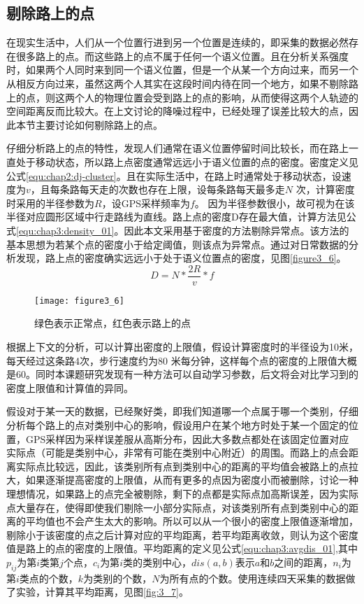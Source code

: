 \subsection{剔除路上的点}
在现实生活中，人们从一个位置行进到另一个位置是连续的，即采集的数据必然存在很多路上的点。而这些路上的点不属于任何一个语义位置。且在分析关系强度时，如果两个人同时来到同一个语义位置，但是一个从某一个方向过来，而另一个从相反方向过来，虽然这两个人其实在这段时间内待在同一个地方，如果不剔除路上的点，则这两个人的物理位置会受到路上的点的影响，从而使得这两个人轨迹的空间距离反而比较大。在上文讨论的降噪过程中，已经处理了误差比较大的点，因此本节主要讨论如何剔除路上的点。
\par 仔细分析路上的点的特性，发现人们通常在语义位置停留时间比较长，而在路上一直处于移动状态，所以路上点密度通常远远小于语义位置的点的密度。密度定义见公式\ref{equ:chap2:dj-cluster}。且在实际生活中，在路上时通常处于移动状态，设速度为$v$，且每条路每天走的次数也存在上限，设每条路每天最多走$N$ 次，计算密度时采用的半径参数为$R$，设GPS采样频率为$f$。 因为半径参数很小，故可视为在该半径对应圆形区域中行走路线为直线。路上点的密度D存在最大值，计算方法见公式\ref{equ:chap3:density_01}。因此本文采用基于密度的方法剔除异常点。该方法的基本思想为若某个点的密度小于给定阈值，则该点为异常点。通过对日常数据的分析发现，路上点的密度确实远远小于处于语义位置点的密度，见图\ref{figure3_6}。
\begin{equation}
\label{equ:chap3:density_01}
D=N \ast \frac{2R}{v} \ast f
\end{equation}
\begin{figure}[htp]
\centering
\texttt{[image: figure3\_6]}
\caption{绿色表示正常点，红色表示路上的点}
\label{fig:3_6}
\end{figure}
\par 根据上下文的分析，可以计算出密度的上限值，假设计算密度时的半径设为10米，每天经过这条路4次，步行速度约为80 米每分钟，这样每个点的密度的上限值大概是60。同时本课题研究发现有一种方法可以自动学习参数，后文将会对比学习到的密度上限值和计算值的异同。
\par 假设对于某一天的数据，已经聚好类，即我们知道哪一个点属于哪一个类别，仔细分析每个路上的点对类别中心的影响，假设用户在某个地方时处于某一个固定的位置，GPS采样因为采样误差服从高斯分布，因此大多数点都处在该固定位置对应实际点（可能是类别中心，非常有可能在类别中心附近）的周围。而路上的点会距离实际点比较远，因此，该类别所有点到类别中心的距离的平均值会被路上的点拉大，如果逐渐提高密度的上限值，从而有更多的点因为密度小而被删除，讨论一种理想情况，如果路上的点完全被剔除，剩下的点都是实际点加高斯误差，因为实际点大量存在，使得即使我们剔除一小部分实际点，对该类别所有点到类别中心的距离的平均值也不会产生太大的影响。所以可以从一个很小的密度上限值逐渐增加，剔除小于该密度的点之后计算对应的平均距离，若平均距离收敛，则认为这个密度值是路上的点的密度的上限值。平均距离的定义见公式\ref{equ:chap3:avgdis_01},其中$p_{ij}$为第$i$类第$j$个点，$c_{i}$为第$i$类的类别中心，$dis(a,b)$表示$a$和$b$之间的距离，$n_{i}$为第$i$类点的个数，$k$为类别的个数，$N$为所有点的个数。使用连续四天采集的数据做了实验，计算其平均距离，见图\ref{fig:3_7}。
